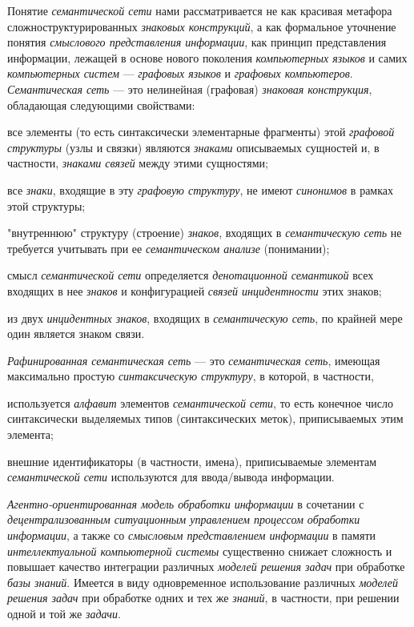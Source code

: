Понятие \textit{семантической сети} нами рассматривается не как красивая метафора сложноструктурированных \textit{знаковых конструкций}, а как формальное уточнение понятия \textit{смыслового представления информации}, как принцип представления информации, лежащей в основе нового поколения \textit{компьютерных языков} и самих \textit{компьютерных систем} --- \textit{графовых языков} и \textit{графовых компьютеров}. \textit{Семантическая сеть} --- это нелинейная (графовая) \textit{знаковая конструкция}, обладающая следующими свойствами:

\begin{textitemize}
	\item все элементы (то есть синтаксически элементарные фрагменты) этой \textit{графовой структуры} (узлы и связки) являются \textit{знаками} описываемых сущностей и, в частности, \textit{знаками связей} между этими сущностями;
	\item все \textit{знаки}, входящие в эту \textit{графовую структуру}, не имеют \textit{синонимов} в рамках этой структуры;
	\item "внутреннюю"{} структуру (строение) \textit{знаков}, входящих в \textit{семантическую сеть} не требуется учитывать при ее \textit{семантическом анализе} (понимании);
	\item смысл \textit{семантической сети} определяется \textit{денотационной семантикой} всех входящих в нее \textit{знаков} и конфигурацией \textit{связей инцидентности} этих знаков;
	\item из двух \textit{инцидентных знаков}, входящих в \textit{семантическую сеть}, по крайней мере один является знаком связи.
\end{textitemize}

\textit{Рафинированная семантическая сеть} --- это \textit{семантическая сеть}, имеющая максимально простую \textit{синтаксическую структуру}, в которой, в частности,

\begin{textitemize}
	\item используется  \textit{алфавит} элементов \textit{семантической сети}, то есть конечное число синтаксически выделяемых типов (синтаксических меток), приписываемых этим элемента;
	\item внешние идентификаторы (в частности, имена), приписываемые элементам \textit{семантической сети} используются  для ввода/вывода информации.
\end{textitemize}

\textit{Агентно-ориентированная модель обработки информации} в сочетании с \textit{децентрализованным ситуационным управлением процессом обработки информации}, а также со \textit{смысловым представлением информации} в памяти \textit{интеллектуальной компьютерной системы} существенно снижает сложность и повышает качество интеграции различных \textit{моделей решения задач} при обработке  \textit{базы знаний}. Имеется в виду одновременное использование различных \textit{моделей решения задач} при обработке одних и тех же \textit{знаний}, в частности, при решении одной и той же \textit{задачи}.

